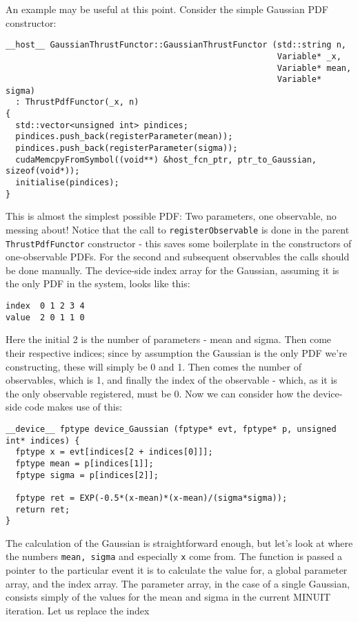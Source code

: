 \documentclass[12pt,pdflatex]{article}
\begin{document}
An example may be useful at this point. Consider the simple Gaussian PDF constructor:
\begin{verbatim}
__host__ GaussianThrustFunctor::GaussianThrustFunctor (std::string n, 
                                                       Variable* _x, 
                                                       Variable* mean, 
                                                       Variable* sigma) 
  : ThrustPdfFunctor(_x, n) 
{
  std::vector<unsigned int> pindices;
  pindices.push_back(registerParameter(mean));
  pindices.push_back(registerParameter(sigma));
  cudaMemcpyFromSymbol((void**) &host_fcn_ptr, ptr_to_Gaussian, sizeof(void*));
  initialise(pindices); 
}
\end{verbatim}
This is almost the simplest possible PDF: Two parameters, one observable, 
no messing about! Notice that the call to \verb|registerObservable| is done
in the parent \verb|ThrustPdfFunctor| constructor - this saves some boilerplate
in the constructors of one-observable PDFs. For the second and subsequent
observables the calls should be done manually. The device-side index array
for the Gaussian, assuming it is the only PDF in the system, looks like this:
\begin{verbatim}
index  0 1 2 3 4
value  2 0 1 1 0
\end{verbatim}
Here the initial 2 is the number of parameters - mean and sigma. Then come their
respective indices; since by assumption the Gaussian is the only PDF we're constructing,
these will simply be 0 and 1. Then comes the number of observables, which is 1, and
finally the index of the observable - which, as it is the only observable registered,
must be 0. Now we can consider how the device-side code makes use of this:
\begin{verbatim}
__device__ fptype device_Gaussian (fptype* evt, fptype* p, unsigned int* indices) {
  fptype x = evt[indices[2 + indices[0]]]; 
  fptype mean = p[indices[1]];
  fptype sigma = p[indices[2]];

  fptype ret = EXP(-0.5*(x-mean)*(x-mean)/(sigma*sigma));
  return ret; 
}
\end{verbatim}
The calculation of the Gaussian is straightforward enough, but let's look
at where the numbers \verb|mean, sigma| and especially \verb|x| come from. 
The function is passed a pointer to the particular event it is to calculate
the value for, a global parameter array, and the index array. The parameter
array, in the case of a single Gaussian, consists simply of the values for
the mean and sigma in the current MINUIT iteration. Let us replace the index
\end{document}
